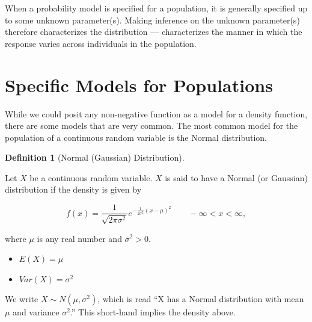 \documentclass[
  letterpaper,
  DIV=11,
  numbers=noendperiod]{scrreprt}
\providecommand{\tightlist}{%
  \setlength{\itemsep}{0pt}\setlength{\parskip}{0pt}}\usepackage{longtable,booktabs,array}
\theoremstyle{definition}
\newtheorem{definition}{Definition}[chapter]
\theoremstyle{definition}
\theoremstyle{remark}
\begin{document}
\begin{tcolorbox}[enhanced jigsaw, left=2mm, toprule=.15mm, arc=.35mm, breakable, opacitybacktitle=0.6, opacityback=0, rightrule=.15mm, colbacktitle=quarto-callout-tip-color!10!white, coltitle=black, leftrule=.75mm, toptitle=1mm, colframe=quarto-callout-tip-color-frame, titlerule=0mm, title=\textcolor{quarto-callout-tip-color}{\faLightbulb}\hspace{0.5em}{Big Idea}, bottomrule=.15mm, colback=white, bottomtitle=1mm]

When a probability model is specified for a population, it is generally
specified up to some unknown parameter(s). Making inference on the
unknown parameter(s) therefore characterizes the distribution ---
characterizes the manner in which the response varies across individuals
in the population.

\end{tcolorbox}

\hypertarget{specific-models-for-populations}{%
\section{Specific Models for
Populations}\label{specific-models-for-populations}}

While we could posit any non-negative function as a model for a density
function, there are some models that are very common. The most common
model for the population of a continuous random variable is the Normal
distribution.

\begin{definition}[Normal (Gaussian)
Distribution]\protect\hypertarget{def-normal-distribution}{}\label{def-normal-distribution}

Let \(X\) be a continuous random variable. \(X\) is said to have a
Normal (or Gaussian) distribution if the density is given by

\[f(x) = \frac{1}{\sqrt{2 \pi \sigma^2}} e^{-\frac{1}{2\sigma^2} (x - \mu)^2} \qquad -\infty < x < \infty,\]

where \(\mu\) is any real number and \(\sigma^2 > 0\).

\begin{itemize}
\tightlist
\item
  \(E(X) = \mu\)
\item
  \(Var(X) = \sigma^2\)
\end{itemize}

We write \(X \sim N\left(\mu, \sigma^2\right)\), which is read ``X has a
Normal distribution with mean \(\mu\) and variance \(\sigma^2\).'' This
short-hand implies the density above.

\end{definition}
\end{document}
